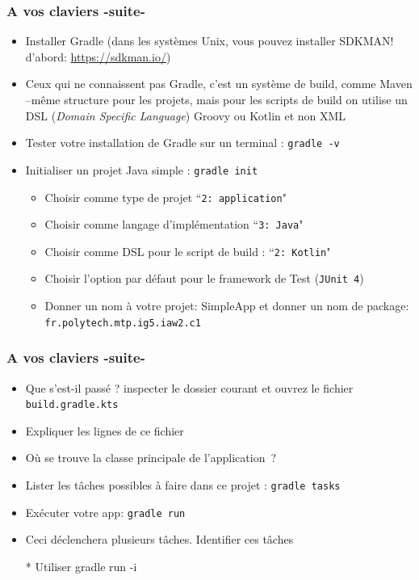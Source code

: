 \documentclass{beamer}
\begin{document}
\begin{frame}
	\frametitle{A vos claviers -suite-}
	
	\begin{itemize}
		\item Installer Gradle (dans les systèmes Unix, vous pouvez installer SDKMAN! d'abord: \url{https://sdkman.io/})
		\item Ceux qui ne connaissent pas Gradle, c'est un système de build, comme Maven --même structure pour les projets, mais pour les scripts de build on utilise un DSL (\textit{Domain Specific Language}) Groovy ou Kotlin et non XML
		\item Tester votre installation de Gradle sur un terminal : \texttt{gradle -v}
		\item Initialiser un projet Java simple : \texttt{gradle init}
		\begin{itemize}
			\item Choisir comme type de projet  ``\texttt{2: application}"
			\item Choisir comme langage d'implémentation ``\texttt{3: Java}"
			\item Choisir comme DSL pour le script de build : ``\texttt{2: Kotlin}"
			\item Choisir l'option par défaut pour le framework de Test (\texttt{JUnit 4})
			\item Donner un nom à votre projet: SimpleApp et donner un nom de package: \texttt{fr.polytech.mtp.ig5.iaw2.c1}
		\end{itemize} 
	\end{itemize}
\end{frame}

\begin{frame}
	\frametitle{A vos claviers -suite-}
	
	\begin{itemize}
		\item Que s'est-il passé ? inspecter le dossier courant et ouvrez le fichier \texttt{build.gradle.kts}
		\item Expliquer les lignes de ce fichier
		\item Où se trouve la classe principale de l'application~?
		\item Lister les tâches possibles à faire dans ce projet : \texttt{gradle tasks}
		\item Exécuter votre app: \texttt{gradle run}
		\item Ceci déclenchera plusieurs tâches. Identifier ces tâches
		\item[*]Utiliser gradle run -i
	\end{itemize}
\end{frame}
\end{document}
